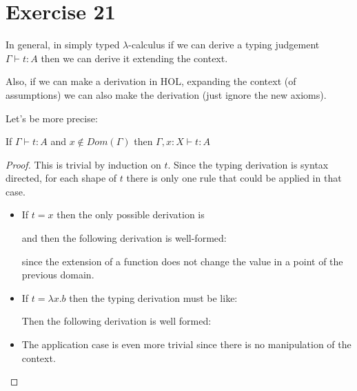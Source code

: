 \section{Exercise 21}

In general, in simply typed $\lambda$-calculus
if we can derive a typing judgement $\Gamma \vdash t : A$
then we can derive it extending the context.

Also, if we can make a derivation in HOL,
expanding the context (of assumptions) we can also make the derivation
(just ignore the new axioms).

Let's be more precise:

\begin{lemma}
  If $\Gamma \vdash t : A$ and $x \notin Dom(\Gamma)$
  then $\Gamma, x:X \vdash t : A$
\end{lemma}
\begin{proof}
  This is trivial by induction on $t$. Since the typing derivation
  is syntax directed, for each shape of $t$ there is only one rule
  that could be applied in that case.
  \begin{itemize}
  \item
    If $t = x$ then the only possible derivation is
    \begin{prooftree}
    \end{prooftree}

    and then the following derivation is well-formed:
    
    \begin{prooftree}
    \end{prooftree}

    since the extension of a function does not change the value in
    a point of the previous domain.
    
  \item
    If $t = \lambda x.b$ then the typing derivation must be like:
    
    \begin{prooftree}
    \end{prooftree}

    Then the following derivation is well formed:
    \begin{prooftree}
    \end{prooftree}

  \item
    The application case is even more
    trivial since there is no manipulation of the context.
  \end{itemize}
\end{proof}



